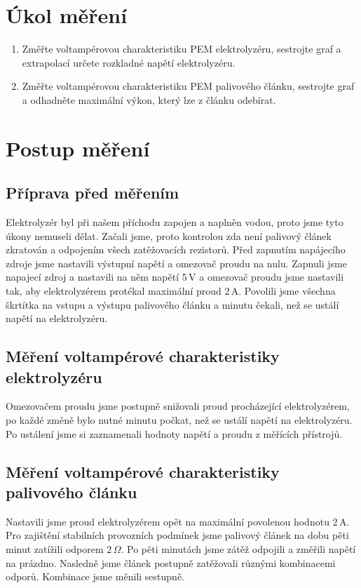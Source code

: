\documentclass[11pt, a4paper]{report}
\begin{document}


\chapter{Úkol měření}
\begin{enumerate}
	\large
	\item Změřte voltampérovou charakteristiku PEM elektrolyzéru, sestrojte graf a extrapolací určete rozkladné napětí elektrolyzéru.
	\item Změřte voltampérovou charakteristiku PEM palivového článku, sestrojte graf a odhadněte maximální výkon, který lze z článku odebírat.
\end{enumerate}

\chapter{Postup měření}
\section{Příprava před měřením}
\large
Elektrolyzér byl při našem příchodu zapojen a naplněn vodou, proto jsme tyto úkony nemuseli dělat.
Začali jsme, proto kontrolou zda není palivový článek zkratován a odpojením všech zatěžovacích rezistorů.
Před zapnutím napájecího zdroje jsme nastavili výstupní napětí a omezovač proudu na nulu.
Zapnuli jsme napajecí zdroj a nastavili na něm napětí 5\,V a omezovač proudu jsme nastavili tak, aby elektrolyzérem protékal maximální proud 2\,A.
Povolili jsme všechna škrtítka na vstupu a výstupu palivového článku a minutu čekali, než se ustálí napětí na elektrolyzéru.

\section{Měření voltampérové charakteristiky elektrolyzéru}
\large
Omezovačem proudu jsme postupně snižovali proud procházející elektrolyzérem, po každé změně bylo nutné minutu počkat, než se ustálí napětí na elektrolyzéru.
Po ustálení jsme si zaznamenali hodnoty napětí a proudu z měřících přístrojů.

\section{Měření voltampérové charakteristiky palivového článku}
\large
Nastavili jsme proud elektrolyzérem opět na maximální povolenou hodnotu 2\,A.
Pro zajištění stabilních provozních podmínek jsme palivový článek na dobu pěti minut zatížili odporem 2\,$\Omega$.
Po pěti minutách jsme zátěž odpojili a změřili napětí na prázdno.
Nasledně jsme článek postupně zatěžovali různými kombinacemi odporů.
Kombinace jsme měnili sestupně.
\end{document}
